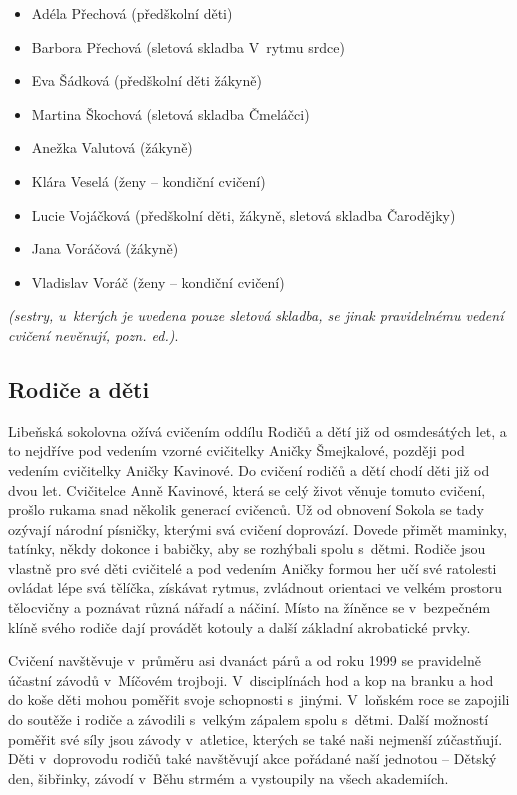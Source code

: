\documentclass[a5paper, 11pt, twoside]{article}
\newcommand{\pozned}[1]{%
\textit{#1}}
\begin{document}
\begin{multicols}{2}
\begin{itemize}[label={},itemindent=-2em,leftmargin=2em]
  \item Adéla Přechová (předškolní děti)
  \item Barbora Přechová (sletová skladba V~rytmu srdce)
  \item Eva Šádková (předškolní děti žákyně)
  \item Martina Škochová (sletová skladba Čmeláčci)
  \item Anežka Valutová (žákyně)
  \item Klára Veselá (ženy -- kondiční cvičení)
  \item Lucie Vojáčková (předškolní děti, žákyně, sletová skladba Čarodějky)
  \item Jana Voráčová (žákyně)
  \item Vladislav Voráč (ženy -- kondiční cvičení)
  \end{itemize}
\end{multicols}


\pozned{(sestry, u~kterých je uvedena
pouze sletová skladba, se jinak pravidelnému vedení cvičení nevěnují,
pozn. ed.)}.

\subsection{Rodiče a děti}

Libeňská sokolovna ožívá cvičením oddílu Rodičů a dětí již od
osmdesátých let, a to nejdříve pod vedením vzorné cvičitelky Aničky
Šmejkalové, později pod vedením cvičitelky Aničky Kavinové. Do cvičení
rodičů a dětí chodí děti již od dvou let. Cvičitelce Anně Kavinové,
která se celý život věnuje tomuto cvičení, prošlo rukama snad několik
generací cvičenců. Už od obnovení Sokola se tady ozývají národní
písničky, kterými svá cvičení doprovází. Dovede přimět maminky, tatínky,
někdy dokonce i babičky, aby se rozhýbali spolu s~dětmi. Rodiče jsou
vlastně pro své děti cvičitelé a pod vedením Aničky formou her učí své
ratolesti ovládat lépe svá tělíčka, získávat rytmus, zvládnout orientaci
ve velkém prostoru tělocvičny a poznávat různá nářadí a náčiní. Místo na
žíněnce se v~bezpečném klíně svého rodiče dají provádět kotouly a další
základní akrobatické prvky.

Cvičení navštěvuje v~průměru asi dvanáct párů a od roku 1999 se
pravidelně účastní závodů v~Míčovém trojboji. V~disciplínách hod a kop
na branku a hod do koše děti mohou poměřit svoje schopnosti s~jinými.
V~loňském roce se zapojili do soutěže i rodiče a závodili s~velkým zápalem
spolu s~dětmi. Další možností poměřit své síly jsou závody v~atletice,
kterých se také naši nejmenší zúčastňují. Děti v~doprovodu rodičů také
navštěvují akce pořádané naší jednotou -- Dětský den, šibřinky, závodí
v~Běhu strmém a vystoupily na všech akademiích.
\end{document}
